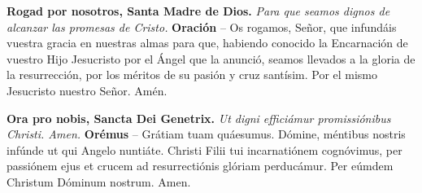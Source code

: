 \documentclass[./devocionario.tex]{subfiles}
\begin{document}
\begin{multicols}{2}
    \textbf{Rogad por nosotros, Santa Madre de Dios.}\newline
    \textit{Para que seamos dignos de alcanzar las promesas de Cristo.}\newline
    \textbf{Oración} -- Os rogamos, Señor, que infundáis vuestra gracia en nuestras almas para que, 
    habiendo conocido la Encarnación de vuestro Hijo Jesucristo por el Ángel que la anunció, 
    seamos llevados a la gloria de la resurrección, por los méritos de su pasión y cruz santísim. 
    Por el mismo Jesucristo nuestro Señor. Amén.

    \columnbreak

    \textbf{Ora pro nobis, Sancta Dei Genetrix.}\newline
    \textit{Ut digni efficiámur promissiónibus Christi. Amen.}\newline
    \textbf{Orémus} -- Grátiam tuam quáesumus. Dómine, méntibus nostris infúnde ut qui Angelo nuntiáte. 
    Christi Filii tui incarnatiónem cognóvimus, per passiónem ejus et crucem ad resurrectiónis glóriam perducámur. 
    Per eúmdem Christum Dóminum nostrum. Amen.
\end{multicols}
\end{document}
